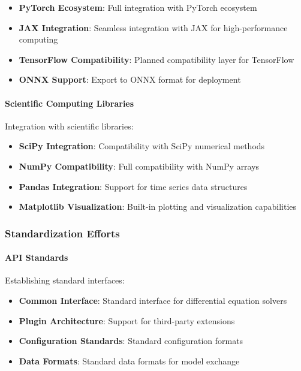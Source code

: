 \begin{itemize}
    \item \textbf{PyTorch Ecosystem}: Full integration with PyTorch ecosystem
    \item \textbf{JAX Integration}: Seamless integration with JAX for high-performance computing
    \item \textbf{TensorFlow Compatibility}: Planned compatibility layer for TensorFlow
    \item \textbf{ONNX Support}: Export to ONNX format for deployment
\end{itemize}

\paragraph{Scientific Computing Libraries}
Integration with scientific libraries:

\begin{itemize}
    \item \textbf{SciPy Integration}: Compatibility with SciPy numerical methods
    \item \textbf{NumPy Compatibility}: Full compatibility with NumPy arrays
    \item \textbf{Pandas Integration}: Support for time series data structures
    \item \textbf{Matplotlib Visualization}: Built-in plotting and visualization capabilities
\end{itemize}

\subsubsection{Standardization Efforts}

\paragraph{API Standards}
Establishing standard interfaces:

\begin{itemize}
    \item \textbf{Common Interface}: Standard interface for differential equation solvers
    \item \textbf{Plugin Architecture}: Support for third-party extensions
    \item \textbf{Configuration Standards}: Standard configuration formats
    \item \textbf{Data Formats}: Standard data formats for model exchange
\end{itemize}

